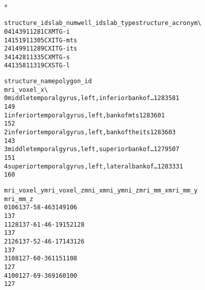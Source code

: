 \documentclass[letterpaper,10pt,english]{/usr/share/sphinx/texinputs/sphinxhowto}
\def\smaller{\fontsize{9.5pt}{9.5pt}\selectfont}
\newenvironment{InvisibleVerbatim}
        {\begin{mdframed}[leftmargin=0.1\linewidth,innerleftmargin=3pt,innerrightmargin=3pt, userdefinedwidth=1\linewidth, linewidth=0pt, linecolor=white, usetwoside=false]}
        {\end{mdframed}}
\begin{document}
                \makebox[0.1\linewidth]{\smaller\hfill\tt\color{nbframe-out-prompt}Out\hspace{4pt}{[}31{]}:\hspace{4pt}}\\*
                \vspace{-2.55\baselineskip}\begin{InvisibleVerbatim}
                \vspace{-0.5\baselineskip}
\begin{alltt}   structure\_id  slab\_num  well\_id slab\_type structure\_acronym  \textbackslash{}
0          4143         9    11281        CX             MTG-i
1          4151         9    11305        CX           ITG-mts
2          4149         9    11289        CX           ITG-its
3          4142         8    11335        CX             MTG-s
4          4135         8    11319        CX             STG-l

                                      structure\_name  polygon\_id
mri\_voxel\_x  \textbackslash{}
0  middle temporal gyrus, left, inferior bank of \ldots     1283581
149
1         inferior temporal gyrus, left, bank of mts     1283601
152
2     inferior temporal gyrus, left, bank of the its     1283603
143
3  middle temporal gyrus, left, superior bank of \ldots     1279507
151
4  superior temporal gyrus, left, lateral bank of\ldots     1283331
160

   mri\_voxel\_y  mri\_voxel\_z  mni\_x  mni\_y  mni\_z  mri\_mm\_x  mri\_mm\_y
mri\_mm\_z
0          106          137    -58    -46      3       149       106
137
1          128          137    -61    -46    -19       152       128
137
2          126          137    -52    -46    -17       143       126
137
3          108          127    -60    -36      1       151       108
127
4          100          127    -69    -36      9       160       100
127\end{alltt}

            \end{InvisibleVerbatim}
            
        
    

        

        \renewcommand{\indexname}{Index}
        \printindex

    
\end{document}
